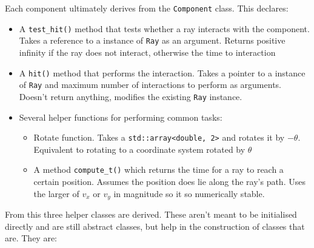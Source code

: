 \documentclass{article}
\begin{document}
Each component ultimately derives from the \texttt{Component} class. This declares:
\begin{itemize}
    \item A \texttt{test\_hit()} method that tests whether a ray interacts with the component. Takes a reference to a instance of \texttt{Ray} as an argument. Returns positive infinity if the ray does not interact, otherwise the time to interaction
    \item A \texttt{hit()} method that performs the interaction. Takes a pointer to a instance of \texttt{Ray} and maximum number of interactions to perform as arguments. Doesn't return anything, modifies the existing \texttt{Ray} instance.
    \item Several helper functions for performing common tasks:
    \begin{itemize}
        \item Rotate function. Takes a \texttt{std::array<double, 2>} and rotates it by $-\theta$. Equivalent to rotating to a coordinate system rotated by $\theta$
        \item A method \texttt{compute\_t()} which returns the time for a ray to reach a certain position. Assumes the position does lie along the ray's path. Uses the larger of $v_x$ or $v_y$ in magnitude so it so numerically stable.
    \end{itemize}
\end{itemize}
From this three helper classes are derived. These aren't meant to be initialised directly and are still abstract classes, but help in the construction of classes that are. They are:
\end{document}
